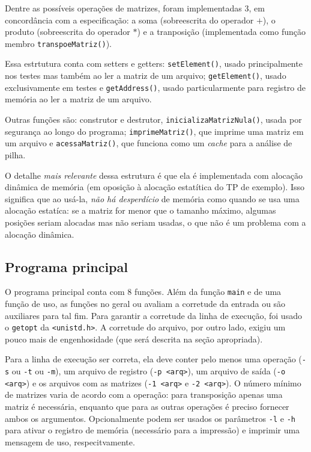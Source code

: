 \documentclass{article}
\def\code#1{\texttt{#1}}
\begin{document}
Dentre as possíveis operações de matrizes, foram implementadas 3, em concordância com a especificação: a soma (sobreescrita do operador \( + \)), o produto (sobreescrita do operador \( * \)) e a tranposição (implementada como função membro \code{transpoeMatriz()}). 

Essa estrtutura conta com setters e getters: \code{setElement()}, usado principalmente nos testes mas também ao ler a matriz de um arquivo; \code{getElement()}, usado exclusivamente em testes e \code{getAddress()}, usado particularmente para registro de memória ao ler a matriz de um arquivo.

Outras funções são: construtor e destrutor, \code{inicializaMatrizNula()}, usada por segurança ao longo do programa; \code{imprimeMatriz()}, que imprime uma matriz em um arquivo e \code{acessaMatriz()}, que funciona como um \textit{cache} para a análise de pilha.

O detalhe \textit{mais relevante} dessa estrutura é que ela é implementada com alocação dinâmica de memória (em oposição à alocação estatítica do TP de exemplo). Isso significa que ao usá-la, \textit{não há desperdício} de memória como quando se usa uma alocação estatíca: se a matriz for menor que o tamanho máximo, algumas posições seriam alocadas mas não seriam usadas, o que não é um problema com a alocação dinâmica.

\subsection{Programa principal}

O programa principal conta com 8 funções. Além da função \code{main} e de uma função de uso, as funções no geral ou avaliam a corretude da entrada ou são auxiliares para tal fim. Para garantir a corretude da linha de execução, foi usado o \code{getopt} da \code{<unistd.h>}. A corretude do arquivo, por outro lado, exigiu um pouco mais de engenhosidade (que será descrita na seção apropriada).

Para a linha de execução ser correta, ela deve conter pelo menos uma operação (\code{-s} ou \code{-t} ou \code{-m}), um arquivo de registro (\code{-p <arq>}), um arquivo de saída (\code{-o <arq>}) e os arquivos com as matrizes (\code{-1 <arq>} e \code{-2 <arq>}). O número mínimo de matrizes varia de acordo com a operação: para transposição apenas uma matriz é necessária, enquanto que para as outras operações é preciso fornecer ambos os argumentos. Opcionalmente podem ser usados os parâmetros \code{-l} e \code{-h} para ativar o registro de memória (necessário para a impressão) e imprimir uma mensagem de uso, respecitvamente.
\end{document}
